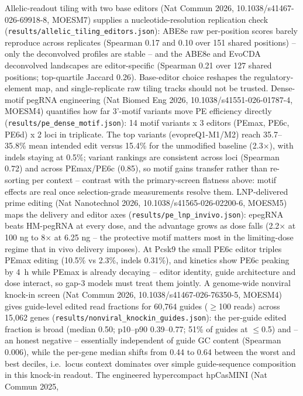 \documentclass[12pt]{article}
\begin{document}
Allelic-readout tiling with two base editors (Nat Commun 2026,
10.1038/s41467-026-69918-8, MOESM7) supplies a nucleotide-resolution
replication check (\texttt{results/allelic\_tiling\_editors.json}):
ABE8e raw per-position scores barely reproduce across replicates
(Spearman 0.17 and 0.10 over 151 shared positions) -- only the
deconvolved profiles are stable -- and the ABE8e and EvoCDA
deconvolved landscapes are editor-specific (Spearman 0.21 over 127
shared positions; top-quartile Jaccard 0.26). Base-editor choice
reshapes the regulatory-element map, and single-replicate raw tiling
tracks should not be trusted.
Dense-motif pegRNA engineering (Nat Biomed Eng 2026,
10.1038/s41551-026-01787-4, MOESM4) quantifies how far 3'-motif
variants move PE efficiency directly (\texttt{results/pe\_dense\_motif.json}):
14 motif variants x 3 editors (PEmax, PE6c, PE6d) x 2 loci in
triplicate. The top variants (evopreQ1-M1/M2) reach 35.7--35.8\%
mean intended edit versus 15.4\% for the unmodified baseline
(2.3$\times$), with indels staying at 0.5\%; variant rankings are
consistent across loci (Spearman 0.72) and across PEmax/PE6c (0.85),
so motif gains transfer rather than re-sorting per context --
contrast with the primary-screen flatness above: motif effects are
real once selection-grade measurements resolve them.
LNP-delivered prime editing (Nat Nanotechnol 2026,
10.1038/s41565-026-02200-6, MOESM5) maps the delivery and editor axes
(\texttt{results/pe\_lnp\_invivo.json}): epegRNA beats HM-pegRNA at
every dose, and the advantage grows as dose falls (2.2$\times$ at
100 ng to 8$\times$ at 6.25 ng -- the protective motif matters most
in the limiting-dose regime that in vivo delivery imposes). At Pcsk9
the small PE6c editor triples PEmax editing (10.5\% vs 2.3\%,
indels 0.31\%), and kinetics show PE6c peaking by 4~h while PEmax is
already decaying -- editor identity, guide architecture and dose
interact, so gap-3 models must treat them jointly.
A genome-wide nonviral knock-in screen (Nat Commun 2026,
10.1038/s41467-026-76350-5, MOESM4) gives guide-level edited read
fractions for 60{,}764 guides ($\geq$100 reads) across 15{,}062 genes
(\texttt{results/nonviral\_knockin\_guides.json}): the per-guide
edited fraction is broad (median 0.50; p10--p90 0.39--0.77; 51\% of
guides at $\leq$0.5) and -- an honest negative -- essentially
independent of guide GC content (Spearman 0.006), while the per-gene
median shifts from 0.44 to 0.64 between the worst and best deciles,
i.e.\ locus context dominates over simple guide-sequence composition
in this knock-in readout.
The engineered hypercompact hpCasMINI (Nat Commun 2025,
\end{document}
